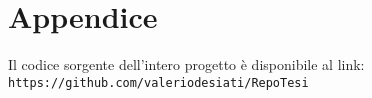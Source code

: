 \chapter{Appendice}
Il codice sorgente dell'intero progetto è disponibile al link:\\
\texttt{https://github.com/valeriodesiati/RepoTesi}